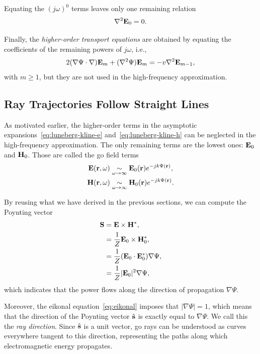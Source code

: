 Equating the $(j\omega)^0$ terms leaves only one remaining relation
\begin{equation}
  \nabla^2 \mathbf{E}_0 = 0.
\end{equation}

Finally, the \emph{higher-order transport equations} are obtained by equating the coefficients of the remaining powers of $j\omega$, i.e.,
\begin{equation}
  2 (\nabla \Psi \cdot \nabla) \mathbf{E}_m + (\nabla^2 \Psi) \mathbf{E}_m = -v \nabla^2 \mathbf{E}_{m-1},
\end{equation}
with $m\ge 1$, but they are not used in the high-frequency approximation.

\subsection{ Ray Trajectories Follow Straight Lines}

As motivated earlier, the higher-order terms in the asymptotic expansions~\eqref{eq:luneberg-kline-e} and~\eqref{eq:luneberg-kline-h} can be neglected in the high-frequency approximation. The only remaining terms are the lowest ones: $\mathbf{E}_0$ and $\mathbf{H}_0$. Those are called the \gls{go} field terms
\begin{align}
  \mathbf{E}(\mathbf{r}, \omega) &\underset{\omega \to \infty}{\sim} \mathbf{E}_0(\mathbf{r}) e^{-jk \Psi(\mathbf{r})},\label{eq:go-e-field}\\
  \mathbf{H}(\mathbf{r}, \omega) &\underset{\omega \to \infty}{\sim} \mathbf{H}_0(\mathbf{r}) e^{-jk \Psi(\mathbf{r})}.\label{eq:go-h-field}
\end{align}

By reusing what we have derived in the previous sections, we can compute the Poynting vector
\begin{align}
  \mathbf{S} &= \mathbf{E}\times\mathbf{H}^*,\\
  &= \frac{1}{Z} \mathbf{E}_0 \times \mathbf{H}_0^*,\\
  &= \frac{1}{Z} (\mathbf{E}_0 \cdot \mathbf{E}_0^*) \nabla \Psi,\\
  &= \frac{1}{Z} |\mathbf{E}_0|^2 \nabla \Psi,
\end{align}
which indicates that the power flows along the direction of propagation $\nabla \Psi$.

Moreover, the eikonal equation~\eqref{eq:eikonal} imposes that $|\nabla \Psi| = 1$, which means that the direction of the Poynting vector $\hat{\mathbf{s}}$ is exactly equal to $\nabla \Psi$. We call this the \emph{ray direction}. Since $\hat{\mathbf{s}}$ is a unit vector, \gls{go} rays can be understood as curves everywhere tangent to this direction, representing the paths along which electromagnetic energy propagates.

